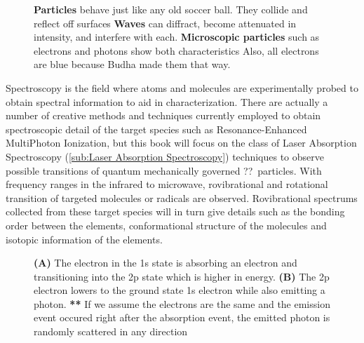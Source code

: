\documentclass[11pt,a4paper]{book}
\newcommand{\imginput}[1]{} %
\begin{document}
	\begin{figure} [!ht]
		\centering
		\Large
		\def\svgwidth{\columnwidth}
		\resizebox{13.5cm}{!}{\imginput{images/particle-wave-duality.pdf_tex}}
		\caption{{\bfseries Particles} behave just like any old soccer ball. They collide and reflect off surfaces \newline
			{\bfseries Waves} can diffract, become attenuated in intensity, and interfere with each. \newline
			{\bfseries Microscopic particles} such as electrons and photons show both characteristics \newline
			Also, all electrons are blue because Budha made them that way.}
		\label{fig:particle-wave-duality}
	\end{figure}
	
	Spectroscopy is the field where atoms and molecules are experimentally probed to obtain spectral information to aid in characterization. There are actually a number of creative methods and techniques currently employed to obtain spectroscopic detail of the target species such as Resonance-Enhanced MultiPhoton Ionization, but this book will focus on the class of Laser Absorption Spectroscopy (\autoref{sub:Laser Absorption Spectroscopy}) techniques to observe possible transitions of quantum mechanically governed ??\ particles. With frequency ranges in the infrared to microwave, rovibrational and rotational transition of targeted molecules or radicals are observed. Rovibrational spectrums collected from these target species will in turn give details such as the bonding order between the elements, conformational structure of the molecules and isotopic information of the elements. 
	
	\begin{figure} [!ht]
		\centering
		\Large
		\def\svgwidth{\columnwidth}
		\resizebox{12cm}{!}{\imginput{images/photon-electron-transition.pdf_tex}}
		\caption{{\bfseries (A)} The electron in the 1s state is absorbing an electron and transitioning into the 2p state which is higher in energy. 
		\newline
		{\bfseries (B)} The 2p electron lowers to the ground state 1s electron while also emitting a photon. \newline
		{\bfseries ***} If we assume the electrons are the same and the emission event occured right after the absorption event,  the emitted photon is randomly scattered in any direction}
		\label{fig:photon-electron-transition}
	\end{figure}		
	
\end{document}
